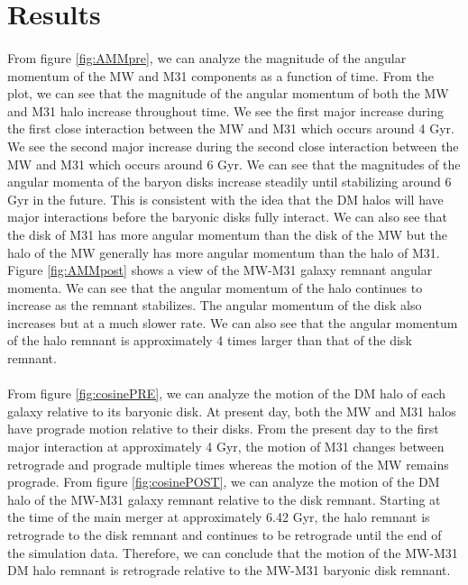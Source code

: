\documentclass[fleqn,usenatbib]{mnras}
\begin{document}
\section{Results}

\paragraph{} From figure \ref{fig:AMMpre}, we can analyze the magnitude of the angular momentum of the MW and M31 components as a function of time. From the plot, we can see that the magnitude of the angular momentum of both the MW and M31 halo increase throughout time. We see the first major increase during the first close interaction between the MW and M31 which occurs around 4 Gyr. We see the second major increase during the second close interaction between the MW and M31 which occurs around 6 Gyr. We can see that the magnitudes of the angular momenta of the baryon disks increase steadily until stabilizing around 6 Gyr in the future. This is consistent with the idea that the DM halos will have major interactions before the baryonic disks fully interact. We can also see that the disk of M31 has more angular momentum than the disk of the MW but the halo of the MW generally has more angular momentum than the halo of M31. Figure \ref{fig:AMMpost} shows a view of the MW-M31 galaxy remnant angular momenta. We can see that the angular momentum of the halo continues to increase as the remnant stabilizes. The angular momentum of the disk also increases but at a much slower rate. We can also see that the angular momentum of the halo remnant is approximately 4 times larger than that of the disk remnant.

\paragraph{} From figure \ref{fig:cosinePRE}, we can analyze the motion of the DM halo of each galaxy relative to its baryonic disk. At present day, both the MW and M31 halos have prograde motion relative to their disks. From the present day to the first major interaction at approximately 4 Gyr, the motion of M31 changes between retrograde and prograde multiple times whereas the motion of the MW remains prograde. From figure \ref{fig:cosinePOST}, we can analyze the motion of the DM halo of the MW-M31 galaxy remnant relative to the disk remnant. Starting at the time of the main merger at approximately 6.42 Gyr, the halo remnant is retrograde to the disk remnant and continues to be retrograde until the end of the simulation data. Therefore, we can conclude that the motion of the MW-M31 DM halo remnant is retrograde relative to the MW-M31 baryonic disk remnant.
\end{document}
